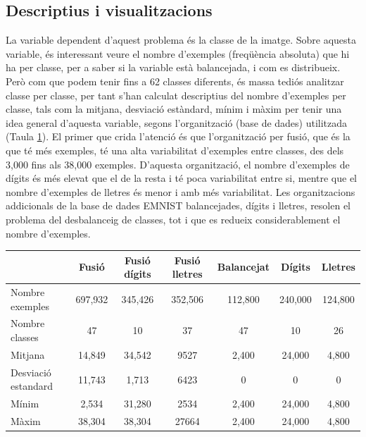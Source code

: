 \documentclass[12pt, spanish]{article}
\begin{document}
\subsection{Descriptius i visualitzacions}

La variable dependent d'aquest problema és la classe de la imatge. Sobre aquesta variable, és interessant veure el nombre d'exemples (freqüència absoluta) que hi ha per classe, per a saber si la variable està balancejada, i com es distribueix. Però com que podem tenir fins a 62 classes diferents, és massa tediós analitzar classe per classe, per tant s'han calculat descriptius del nombre d'exemples per classe, tals com la mitjana, desviació estàndard, mínim i màxim per tenir una idea general d'aquesta variable, segons l'organització (base de dades) utilitzada (Taula \ref{tab:taula1}). El primer que crida l'atenció és que l'organització per fusió, que és la que té més exemples, té una alta variabilitat d'exemples entre classes, des dels 3,000 fins als 38,000 exemples. D'aquesta organització, el nombre d'exemples de dígits és més elevat que el de la resta i té poca variabilitat entre si, mentre que el nombre d'exemples de lletres és menor i amb més variabilitat. Les organitzacions addicionals de la base de dades EMNIST balancejades, dígits i lletres, resolen el problema del desbalanceig de classes, tot i que es redueix considerablement el nombre d'exemples. 

\begin{table}[hbt!]
\centering
\begin{tabular}{lcccccc}  
\toprule
                            & Fusió & Fusió dígits & Fusió lletres & Balancejat & Dígits & Lletres \\  
\midrule
Nombre exemples    & 697,932 & 345,426  & 352,506 & 112,800 & 240,000 & 124,800 \\
Nombre classes        & 47         & 10          & 37         & 47        & 10          & 26      \\
Mitjana                   & 14,849   & 34,542    & 9527     & 2,400    & 24,000    & 4,800 \\
Desviació estandard  & 11,743   & 1,713      & 6423    & 0           & 0            & 0       \\
Mínim                     & 2,534      & 31,280   & 2534    & 2,400      & 24,000   & 4,800 \\
Màxim                    & 38,304    & 38,304   & 27664   & 2,400      & 24,000   & 4,800 \\
\bottomrule
\end{tabular}
\label{tab:taula1}
\end{table}
\end{document}

